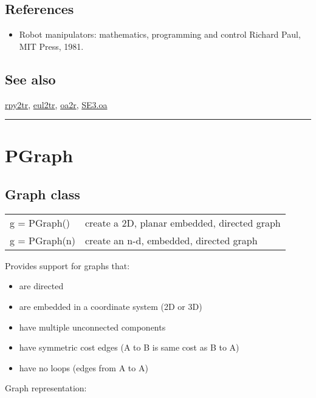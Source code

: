 \subsection*{References}
\begin{itemize}
  \item Robot manipulators: mathematics, programming and control    Richard Paul, MIT Press, 1981.
\end{itemize}

\subsection*{See also}


\hyperlink{rpy2tr}{\color{blue} rpy2tr}, \hyperlink{eul2tr}{\color{blue} eul2tr}, \hyperlink{oa2r}{\color{blue} oa2r}, \hyperlink{SE3.oa}{\color{blue} SE3.oa}

\vspace{1.5ex}\rule{\textwidth}{1mm}

\hypertarget{PGraph}{\section*{PGraph}}
\subsection*{Graph class}
\begin{longtable}{lp{120mm}}
g = PGraph() & create a 2D, planar embedded, directed graph\\ 
g = PGraph(n) & create an n-d, embedded, directed graph\\ 
\end{longtable}\vspace{1ex}


Provides support for graphs that:

\begin{itemize}
  \item are directed
  \item are embedded in a coordinate system (2D or 3D)
  \item have multiple unconnected components
  \item have symmetric cost edges (A to B is same cost as B to A)
  \item have no loops (edges from A to A)
\end{itemize}


Graph representation:

